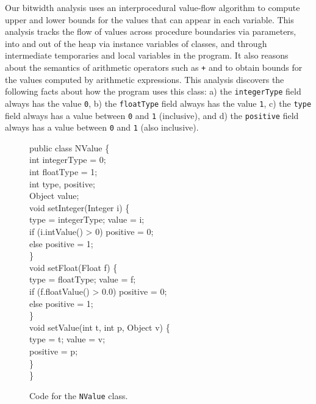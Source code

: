 \documentclass[oribibl]{llncs}
\begin{document}
Our bitwidth analysis uses an interprocedural
value-flow algorithm to compute upper and lower bounds for the
values that can appear in each variable. This analysis tracks
the flow of values across procedure boundaries via parameters,
into and out of the heap via instance variables of classes, and through
intermediate temporaries and local variables in the program.
It also reasons about the semantics of arithmetic operators such
as {\tt +} and {\tt *} to obtain bounds for the values computed
by arithmetic expressions. 
This analysis discovers the following facts about 
how the program uses this class: a) the {\tt integerType} 
field always has the value {\tt 0}, b) the {\tt floatType} 
field always has the value {\tt 1}, c) the {\tt type} 
field always has a value between {\tt 0} and {\tt 1} (inclusive),
and d) the {\tt positive} field always has a value between 
{\tt 0} and {\tt 1} (also inclusive).

\begin{figure}[tp]
\small\renewcommand{\baselinestretch}{0.5}\begin{samplecode}
public class NValue \{ \\
\>int integerType = 0;\\
\>int floatType = 1;\\
\>int type, positive;\\
\>Object value;\\
\>void setInteger(Integer i) \{ \\
\>\>type = integerType; value = i;\\
\>\>if (i.intValue() > 0) positive = 0;\\
\>\>else positive = 1;\\
\>\}\\
\>void setFloat(Float f) \{ \\
\>\>type = floatType; value = f;\\
\>\>if (f.floatValue() > 0.0) positive = 0;\\
\>\>else positive = 1;\\
\>\}\\
\>void setValue(int t, int p, Object v) \{ \\
\>\>type = t; value = v;\\
\>\>positive = p;\\
\>\}\\
\}
\end{samplecode}%
\caption{\label{fig:value} Code for the {\tt NValue} class.}
\end{figure}
\end{document}
